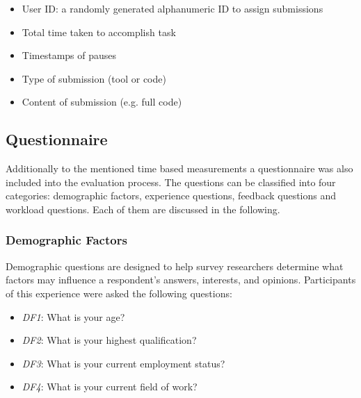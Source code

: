 \begin{itemize}
    \item User ID: a randomly generated alphanumeric ID to assign submissions
    \item Total time taken to accomplish task
    \item Timestamps of pauses
    \item Type of submission (tool or code)
    \item Content of submission (e.g. full code)
\end{itemize}

\subsection{Questionnaire}
Additionally to the mentioned time based measurements a questionnaire was also included into the evaluation process. The questions can be classified into four categories: demographic factors, experience questions, feedback questions and workload questions. Each of them are discussed in the following.

\subsubsection*{Demographic Factors}
Demographic questions are designed to help survey researchers determine what factors may influence a respondent's answers, interests, and opinions. Participants of this experience were asked the following questions:

\begin{itemize}
    \item \textit{DF1}: What is your age?
    \item \textit{DF2}: What is your highest qualification?
    \item \textit{DF3}: What is your current employment status?
    \item \textit{DF4}: What is your current field of work?
\end{itemize}


